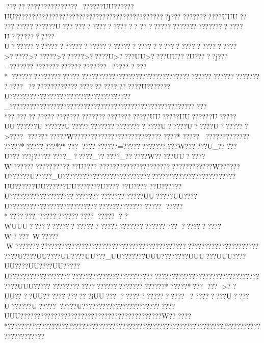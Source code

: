 {{{{{{{{{{{{{{{{{{{{{{{{{{{{{{{{{{{{{{{{{{{{{{{{{{{{{{{{{{{{{{{{{{{{{{{{{{{{{{{{{{{{{{{{{{{{{{{{{{{{{{{{{{{{{{{{{{{{{{{{{{{{{{{{{{{{{{{{{{{{{{{{{{{{{{{{{{{{{{{{{{{{{{{{{{{{{{{{{{{{{{{{{{{{{{{{{{{{{{{{{{{{{{{{{{{{{{{{{{{{{{{{{{{{{{{{{{{{{{{{{{{{{{{{{{{{{{{{{{{{{{{{{{{{{{{{{{{{{{{{{{{{{{{{{{{{{{{{{{{{{{{{{{{{{{{{{{{{{{{{{{{{{{{{{{{{{{{{{{{{{{{{{{{{{{{{{{{{{{{{{{{{{{{{{{{{{{{{{{{{{{{{{{{{{{{{{{{{{{{{{{{{{{{{{{{{{{{{{{{{{{{{{{{{{{{{{{{{{{{{{{{{{{{{{{{{{{{{{{{{{{{{{{{{{{{{{{{{{{{{{{{{{{{{{{{{{{{{{{{{{{{{{{{{{{{{{{{{{{{{{{{{{{{{{{{{{{{{{{{{{{{{{{{{{{{{{{{{{{{{????????????????????_??????UU??????UU????   ?????   ????????????????????????????????????j??????????????UUU?? ????? ?????????U??? ????? ????? ????? 
???????????????????????????U???????????U???????????????????????????????? ?????????? ????? ????? ???>?? ???>??????>??????>?????U>????UU>????UU???U?????j???=????????????????? ??????  ????=????*????*??? ?????? ??????????????????????????????????????????????????????????????????_???  ?????? ?????????????????????U???????U????????????????????????????????????_???????????????????????????????????????  ?????? ??????? ?????? *????? ???? ?????????????????????????????UU?????UU??????U?????UU??????U??????U???  ?????????????????????U?????U?????U???????>????
??? ?????? ??W???  ????? ??????  ????????????????*?????
????????????? ?????*  ????????*?*???  ????  ????  ??=???????????????W??????U_?????U??????j?????????_?????_??????_??????W?????UU?????W??? ?????? ?????????U???? 
?????????????????????????????????W??????U??????U?????_U??????????  ?????  ????? ?????? ?????  "????   ????   ????   ???????UU??????UU??????UU???????U????
??U????
??U???? ??U???? ???????  ??????  ?????????????????????UU?????UU????U????????????????????????????????????????????
?????*????  ???  ??????????????? ?????
??WUUU??  ????????????????  ???????????? ?????? ???? ????????W????~W?????W?????????????????????????????????????????????????????????????? ??????????? ??U????UU????UU????UU???_UU???   ????UUU????   ????UUU???UUU????UU????UU????UU?????U???????????????????????? ?????? ?????? ?????? ?????  ?????  ?????  ?????  ???????????????UUU?????   ???????????????????????????????*?????*???
  ???
  >??UU????UU??????  ???  ???iUU???
   ?? ??????????????~?? ????? ??U?? ??U??????U??? ????? ??U???? ???????????????????????UUU???????????? ??????????????????????????????W?? ????  *???? ???????????????????????????????????????????????????????????????????????????????????
}}}}}}}}}}}}}}}}}}}}}}}}}}}}}}}}}}}}}}}}}}}}}}}}}}}}}}}}}}}}}}}}}}}}}}}}}}}}}}}}}}}}}}}}}}}}}}}}}}}}}}}}}}}}}}}}}}}}}}}}}}}}}}}}}}}}}}}}}}}}}}}}}}}}}}}}}}}}}}}}}}}}}}}}}}}}}}}}}}}}}}}}}}}}}}}}}}}}}}}}}}}}}}}}}}}}}}}}}}}}}}}}}}}}}}}}}}}}}}}}}}}}}}}}}}}}}}}}}}}}}}}}}}}}}}}}}}}}}}}}}}}}}}}}}}}}}}}}}}}}}}}}}}}}}}}}}}}}}}}}}}}}}}}}}}}}}}}}}}}}}}}}}}}}}}}}}}}}}}}}}}}}}}}}}}}}}}}}}}}}}}}}}}}}}}}}}}}}}}}}}}}}}}}}}}}}}}}}}}}}}}}}}}}}}}}}}}}}}}}}}}}}}}}}}}}}}}}}}}}}}}}}}}}}}}}}}}}}}}}}}}}}}}}}}}}}}}}}}}}}}}}}}}}}}}}}}}}}}}}}}}}}}}}}}}}}}}}}}}}}}}}}}}}}}}}}}}}}}}}}
